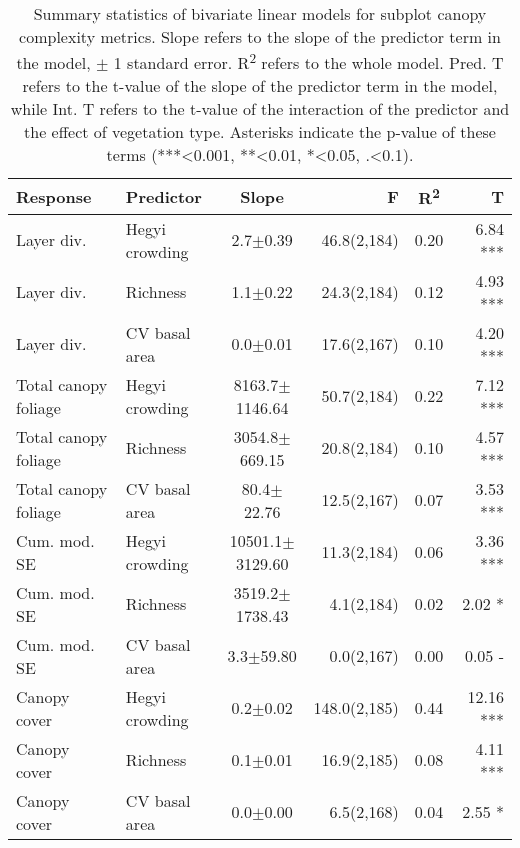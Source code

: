 \begin{table}
\centering
\begin{tabular}{llS[table-format=5.1(4.2)]rS[table-format=1.2]r}
  \hline
Response & Predictor & Slope & F & R\textsuperscript{2} & T \\ 
  \hline
Layer div. & Hegyi crowding & 2.7$\pm$0.39 & 46.8(2,184) & 0.20 & 6.84 *** \\ 
  Layer div. & Richness & 1.1$\pm$0.22 & 24.3(2,184) & 0.12 & 4.93 *** \\ 
  Layer div. & CV basal area & 0.0$\pm$0.01 & 17.6(2,167) & 0.10 & 4.20 *** \\ 
  Total canopy foliage & Hegyi crowding & 8163.7$\pm$1146.64 & 50.7(2,184) & 0.22 & 7.12 *** \\ 
  Total canopy foliage & Richness & 3054.8$\pm$669.15 & 20.8(2,184) & 0.10 & 4.57 *** \\ 
  Total canopy foliage & CV basal area & 80.4$\pm$22.76 & 12.5(2,167) & 0.07 & 3.53 *** \\ 
  Cum. mod. SE & Hegyi crowding & 10501.1$\pm$3129.60 & 11.3(2,184) & 0.06 & 3.36 *** \\ 
  Cum. mod. SE & Richness & 3519.2$\pm$1738.43 & 4.1(2,184) & 0.02 & 2.02 * \\ 
  Cum. mod. SE & CV basal area & 3.3$\pm$59.80 & 0.0(2,167) & 0.00 & 0.05 - \\ 
  Canopy cover & Hegyi crowding & 0.2$\pm$0.02 & 148.0(2,185) & 0.44 & 12.16 *** \\ 
  Canopy cover & Richness & 0.1$\pm$0.01 & 16.9(2,185) & 0.08 & 4.11 *** \\ 
  Canopy cover & CV basal area & 0.0$\pm$0.00 & 6.5(2,168) & 0.04 & 2.55 * \\ 
   \hline
\end{tabular}
\caption{Summary statistics of bivariate linear models for subplot canopy complexity metrics. Slope refers to the slope of the predictor term in the model, $\pm{}$ 1 standard error. R\textsuperscript{2} refers to the whole model. Pred. T refers to the t-value of the slope of the predictor term in the model, while Int. T refers to the t-value of the interaction of the predictor and the effect of vegetation type. Asterisks indicate the p-value of these terms (***<0.001, **<0.01, *<0.05, .<0.1).} 
\label{mod_bivar_lm_summ}
\end{table}

